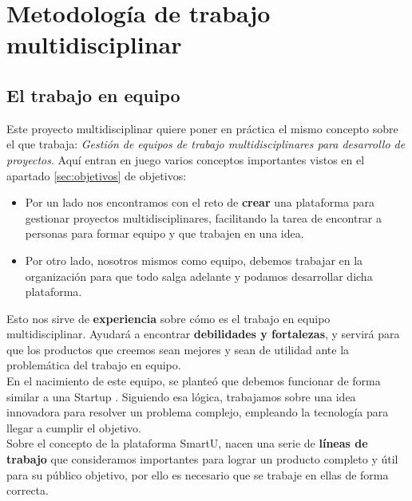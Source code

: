 \chapter{Metodología de trabajo multidisciplinar}
\label{ch:metodologia}

\section{El trabajo en equipo}
Este proyecto multidisciplinar quiere poner en práctica el mismo concepto sobre el que trabaja: \textit{Gestión de equipos de trabajo multidisciplinares para desarrollo de proyectos}. Aquí entran en juego varios conceptos importantes vistos en el apartado \ref{sec:objetivos} de objetivos:

\begin{itemize}
    \item Por un lado nos encontramos con el reto de \textbf{crear} una plataforma para gestionar proyectos multidisciplinares, facilitando la tarea de encontrar a personas para formar equipo y que trabajen en una idea.
    \item Por otro lado, nosotros mismos como equipo, debemos trabajar en la organización para que todo salga adelante y podamos desarrollar dicha plataforma.
\end{itemize}

Esto nos sirve de \textbf{experiencia} sobre cómo es el trabajo en equipo multidisciplinar. Ayudará a encontrar \textbf{debilidades y fortalezas}, y servirá para que los productos que creemos sean mejores y sean de utilidad ante la problemática del trabajo en equipo.\\

En el nacimiento de este equipo, se planteó que debemos funcionar de forma similar a una Startup \cite{startup}. Siguiendo esa lógica, trabajamos sobre una idea innovadora para resolver un problema complejo, empleando la tecnología para llegar a cumplir el objetivo.\\

Sobre el concepto de la plataforma SmartU, nacen una serie de \textbf{líneas de trabajo} que consideramos importantes para lograr un producto completo y útil para su público objetivo, por ello es necesario que se trabaje en ellas de forma correcta.

